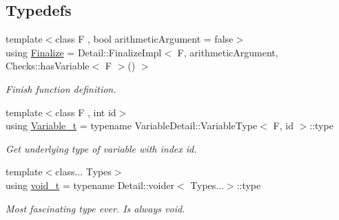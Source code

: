 \subsection*{Typedefs}
\begin{DoxyCompactItemize}
\item 
{\footnotesize template$<$class F , bool arithmetic\-Argument = false$>$ }\\using \hyperlink{namespaceRFFGen_a394df0f2ab428f4a972b4d93900a5e04}{Finalize} = Detail\-::\-Finalize\-Impl$<$ F, arithmetic\-Argument, Checks\-::has\-Variable$<$ F $>$() $>$
\begin{DoxyCompactList}\small\item\em Finish function definition. \end{DoxyCompactList}\item 
\hypertarget{namespaceRFFGen_acc6abb2e40c9688574411fd42898fab4}{{\footnotesize template$<$class F , int id$>$ }\\using \hyperlink{namespaceRFFGen_acc6abb2e40c9688574411fd42898fab4}{Variable\-\_\-t} = typename Variable\-Detail\-::\-Variable\-Type$<$ F, id $>$\-::type}\label{namespaceRFFGen_acc6abb2e40c9688574411fd42898fab4}

\begin{DoxyCompactList}\small\item\em Get underlying type of variable with index id. \end{DoxyCompactList}\item 
\hypertarget{namespaceRFFGen_a20e18569d04cc91cf19632c12cd4a0d8}{{\footnotesize template$<$class... Types$>$ }\\using \hyperlink{namespaceRFFGen_a20e18569d04cc91cf19632c12cd4a0d8}{void\-\_\-t} = typename Detail\-::voider$<$ Types...$>$\-::type}\label{namespaceRFFGen_a20e18569d04cc91cf19632c12cd4a0d8}

\begin{DoxyCompactList}\small\item\em Most fascinating type ever. Is always void. \end{DoxyCompactList}\end{DoxyCompactItemize}
